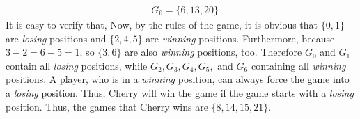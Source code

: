 \begin{multicols}{2}
\begin{align*}
		& G_6=\{6,13,20\}
	\end{align*}
	It is easy to verify that,
	\vskip 0.2cm
	\vskip 0.2cm
	Now, by the rules of the game, it is obvious that $\{0, 1\}$ are \textit{losing} positions and $\{2,4,5\}$ are \textit{winning} positions.
	Furthermore, because $3-2=6-5=1$, so $\{3,6\}$ are also \textit{winning} positions, too.
	\vskip 0.1cm
	Therefore $G_0$ and $G_1$ contain all \textit{losing} positions, while $G_2,G_3,G_4,G_5,$ and $G_6$ containing all \textit{winning} positions.
	A player, who is in a \textit{winning} position, can always force the game into a \textit{losing} position.
	Thus, Cherry will win the game if the game starts with a \textit{losing} position.
	Thus, the games that Cherry wins are $\{8,14,15,21\}$.
\end{multicols}